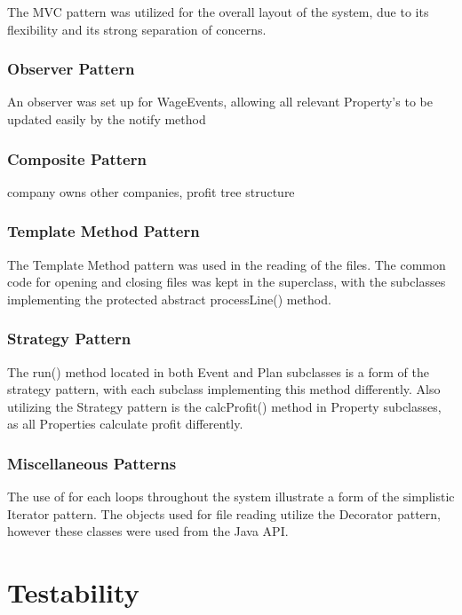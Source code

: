 \documentclass[]{article}
\begin{document}
The MVC pattern was utilized for the overall layout of the system, due to its flexibility and its strong separation of concerns.

\subsubsection*{Observer Pattern}

An observer was set up for WageEvents, allowing all relevant Property's to be updated easily by the notify method

\subsubsection*{Composite Pattern}

company owns other companies, profit tree structure

\subsubsection*{Template Method Pattern}

The Template Method pattern was used in the reading of the files. The common code for opening and closing files was kept in the superclass, with the subclasses implementing the protected abstract processLine() method.

\subsubsection*{Strategy Pattern}

The run() method located in both Event and Plan subclasses is a form of the strategy pattern, with each subclass implementing this method differently. Also utilizing the Strategy pattern is the calcProfit() method in Property subclasses, as all Properties calculate profit differently.

\subsubsection*{Miscellaneous Patterns}

The use of for each loops throughout the system illustrate a form of the simplistic Iterator pattern. The objects used for file reading utilize the Decorator pattern, however these classes were used from the Java API.


\section*{Testability}
\end{document}
